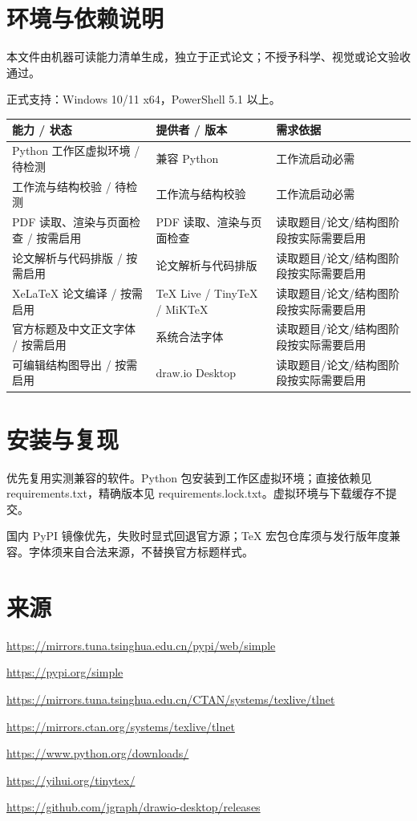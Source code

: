 \documentclass[UTF8,a4paper,10pt]{ctexart}
\begin{document}
\section*{环境与依赖说明}
本文件由机器可读能力清单生成，独立于正式论文；不授予科学、视觉或论文验收通过。
\par 正式支持：Windows 10/11 x64，PowerShell 5.1 以上。
\small
\begin{longtable}{>{\raggedright\arraybackslash}p{.19\linewidth}>{\raggedright\arraybackslash}p{.27\linewidth}>{\raggedright\arraybackslash}p{.43\linewidth}}
\toprule 能力 / 状态 & 提供者 / 版本 & 需求依据 \\ \midrule\endhead
Python 工作区虚拟环境 / 待检测 & 兼容 Python  & 工作流启动必需 \\
工作流与结构校验 / 待检测 & 工作流与结构校验  & 工作流启动必需 \\
PDF 读取、渲染与页面检查 / 按需启用 & PDF 读取、渲染与页面检查  & 读取题目/论文/结构图阶段按实际需要启用 \\
论文解析与代码排版 / 按需启用 & 论文解析与代码排版  & 读取题目/论文/结构图阶段按实际需要启用 \\
XeLaTeX 论文编译 / 按需启用 & TeX Live / TinyTeX / MiKTeX  & 读取题目/论文/结构图阶段按实际需要启用 \\
官方标题及中文正文字体 / 按需启用 & 系统合法字体  & 读取题目/论文/结构图阶段按实际需要启用 \\
可编辑结构图导出 / 按需启用 & draw.io Desktop  & 读取题目/论文/结构图阶段按实际需要启用 \\
\bottomrule\end{longtable}
\normalsize\section*{安装与复现}
优先复用实测兼容的软件。Python 包安装到工作区虚拟环境；直接依赖见 requirements.txt，精确版本见 requirements.lock.txt。虚拟环境与下载缓存不提交。
\par 国内 PyPI 镜像优先，失败时显式回退官方源；TeX 宏包仓库须与发行版年度兼容。字体须来自合法来源，不替换官方标题样式。
\section*{来源}
\noindent\url{https://mirrors.tuna.tsinghua.edu.cn/pypi/web/simple}\par
\noindent\url{https://pypi.org/simple}\par
\noindent\url{https://mirrors.tuna.tsinghua.edu.cn/CTAN/systems/texlive/tlnet}\par
\noindent\url{https://mirrors.ctan.org/systems/texlive/tlnet}\par
\noindent\url{https://www.python.org/downloads/}\par
\noindent\url{https://yihui.org/tinytex/}\par
\noindent\url{https://github.com/jgraph/drawio-desktop/releases}\par
\end{document}
